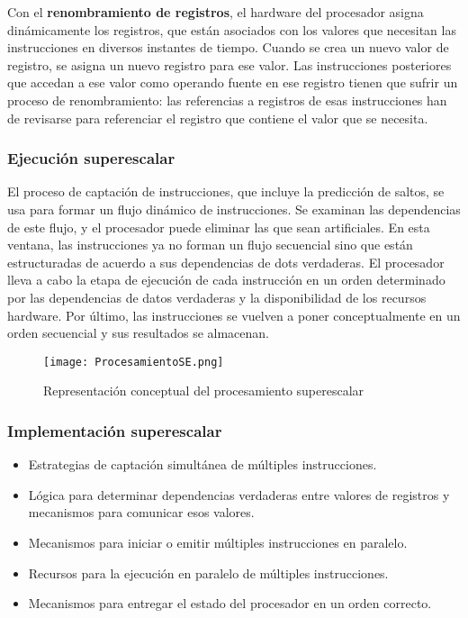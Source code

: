 Con el \textbf{renombramiento de registros}, el hardware del procesador asigna dinámicamente los registros, que están asociados con los valores que necesitan las instrucciones en diversos instantes de tiempo. Cuando se crea un nuevo valor de registro, se asigna un nuevo registro para ese valor. Las instrucciones posteriores que accedan a ese valor como operando fuente en ese registro tienen que sufrir un proceso de renombramiento: las referencias a registros de esas instrucciones han de revisarse para referenciar el registro que contiene el valor que se necesita. 

\subsubsection*{Ejecución superescalar}

El proceso de captación de instrucciones, que incluye la predicción de saltos, se usa para formar un flujo dinámico de instrucciones. Se examinan las dependencias de este flujo, y el procesador puede eliminar las que sean artificiales. En esta ventana, las instrucciones ya no forman un flujo secuencial sino que están estructuradas de acuerdo a sus dependencias de dots verdaderas. El procesador lleva a cabo la etapa de ejecución de cada instrucción en un orden determinado por las dependencias de datos verdaderas y la disponibilidad de los recursos hardware. Por último, las instrucciones se vuelven a poner conceptualmente en un orden secuencial y sus resultados se almacenan.

\begin{figure}[H]
  \centering
  \texttt{[image: ProcesamientoSE.png]}
  \caption{Representación conceptual del procesamiento superescalar}
\end{figure}

\subsubsection*{Implementación superescalar}

\begin{itemize}
  \item Estrategias de captación simultánea de múltiples instrucciones.
  \item Lógica para determinar dependencias verdaderas entre valores de registros y mecanismos para comunicar esos valores.
  \item Mecanismos para iniciar o emitir múltiples instrucciones en paralelo.
  \item Recursos para la ejecución en paralelo de múltiples instrucciones.
  \item Mecanismos para entregar el estado del procesador en un orden correcto.
\end{itemize}


